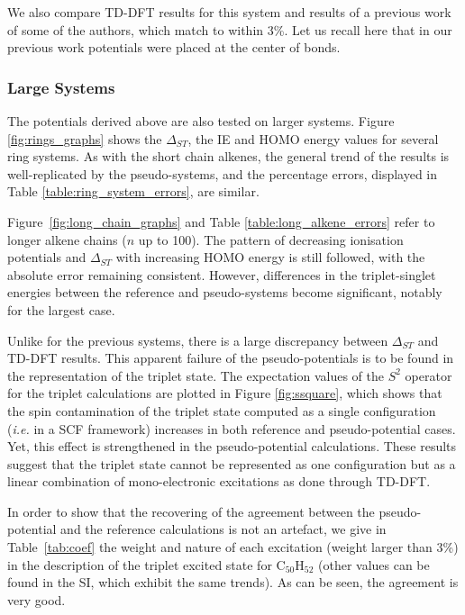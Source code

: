 \documentclass[12pt]{article}
\begin{document}
We also compare TD-DFT results for this system and results of a previous work of some of the authors, which match to within 3\%.\cite{drujon_pseudopotentials_2013}
Let us recall here that in our previous work potentials were placed at the center of bonds.

\subsubsection*{\sffamily \large Large Systems}

The potentials derived above are also tested on larger systems.
Figure \ref{fig:rings_graphs} shows the $\Delta_{ST}$, the IE and
HOMO energy values for several ring systems.
As with the short chain alkenes, the general trend of the results is well-replicated
by the pseudo-systems, and the percentage errors, displayed in Table
\ref{table:ring_system_errors}, are similar.

Figure~\ref{fig:long_chain_graphs} and Table \ref{table:long_alkene_errors} refer to longer 
alkene chains (\(n\) up to 100).
The pattern of decreasing ionisation potentials and $\Delta_{ST}$ with increasing HOMO
energy is still followed, with the absolute error remaining consistent.
However, differences in the triplet-singlet energies between the reference and pseudo-systems 
become significant, notably for the largest case.

Unlike for the previous systems, there is a large discrepancy between $\Delta_{ST}$
and TD-DFT results.
This apparent failure of the pseudo-potentials is to be found in the representation
of the triplet state. The expectation values of the $S^2$ operator for the triplet calculations
are plotted in Figure \ref{fig:ssquare}, which shows that the spin contamination
of the triplet state computed as a single configuration (\emph{i.e.} in a SCF
framework) increases in both reference and pseudo-potential cases.
Yet, this effect is strengthened in the pseudo-potential calculations.
These results suggest that the triplet state cannot be represented as one configuration
but as a linear combination of mono-electronic excitations as done through TD-DFT.

In order to show that the recovering of the agreement between the pseudo-potential
and the reference calculations is not an artefact, we give in Table~\ref{tab:coef}
the weight and nature of each excitation (weight larger than 3\%)
in the description of the triplet excited state for
C$_{50}$H$_{52}$ (other values can be found in the SI, which exhibit the same trends).
As can be seen, the agreement is very good. 
\end{document}
